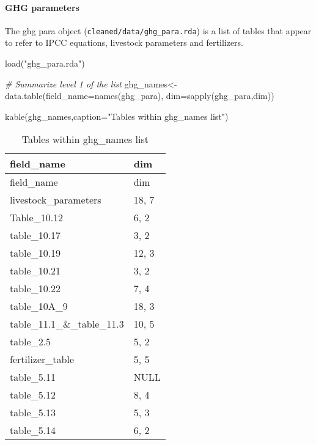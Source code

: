 \documentclass[
]{article}
\newenvironment{Shaded}{\begin{snugshade}}{\end{snugshade}}
\newcommand{\AttributeTok}[1]{\textcolor[rgb]{0.77,0.63,0.00}{#1}}
\newcommand{\CommentTok}[1]{\textcolor[rgb]{0.56,0.35,0.01}{\textit{#1}}}
\newcommand{\FunctionTok}[1]{\textcolor[rgb]{0.00,0.00,0.00}{#1}}
\newcommand{\NormalTok}[1]{#1}
\newcommand{\OtherTok}[1]{\textcolor[rgb]{0.56,0.35,0.01}{#1}}
\newcommand{\StringTok}[1]{\textcolor[rgb]{0.31,0.60,0.02}{#1}}
\begin{document}
\hypertarget{ghg-parameters}{%
\paragraph{GHG parameters}\label{ghg-parameters}}

The ghg para object (\texttt{cleaned/data/ghg\_para.rda}) is a list of
tables that appear to refer to IPCC equations, livestock parameters and
fertilizers.

\begin{Shaded}
\begin{Highlighting}[]
\FunctionTok{load}\NormalTok{(}\StringTok{"ghg\_para.rda"}\NormalTok{)}

\CommentTok{\# Summarize level 1 of the list}
\NormalTok{ghg\_names}\OtherTok{\textless{}{-}}\FunctionTok{data.table}\NormalTok{(}\AttributeTok{field\_name=}\FunctionTok{names}\NormalTok{(ghg\_para),}
                          \AttributeTok{dim=}\FunctionTok{sapply}\NormalTok{(ghg\_para,dim))}

\FunctionTok{kable}\NormalTok{(ghg\_names,}\AttributeTok{caption=}\StringTok{"Tables within ghg\_names list"}\NormalTok{)}
\end{Highlighting}
\end{Shaded}

\begin{longtable}[]{@{}ll@{}}
\caption{Tables within ghg\_names list}\tabularnewline
\toprule()
field\_name & dim \\
\midrule()
\endfirsthead
\toprule()
field\_name & dim \\
\midrule()
\endhead
livestock\_parameters & 18, 7 \\
Table\_10.12 & 6, 2 \\
table\_10.17 & 3, 2 \\
table\_10.19 & 12, 3 \\
table\_10.21 & 3, 2 \\
table\_10.22 & 7, 4 \\
table\_10A\_9 & 18, 3 \\
table\_11.1\_\&\_table\_11.3 & 10, 5 \\
table\_2.5 & 5, 2 \\
fertilizer\_table & 5, 5 \\
table\_5.11 & NULL \\
table\_5.12 & 8, 4 \\
table\_5.13 & 5, 3 \\
table\_5.14 & 6, 2 \\
\bottomrule()
\end{longtable}
\end{document}

